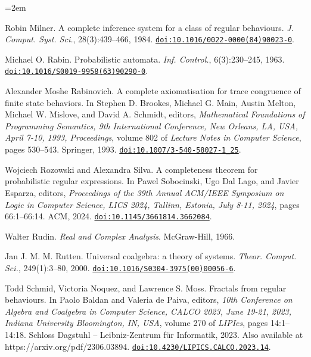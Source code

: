 \documentclass[11pt,a4paper]{amsart}
\begin{document}
\begin{list}{}{\leftmargin=2em}
\hypertarget{html:bib.bib15}{}
\item[]  [15]  Robin Milner.  A complete inference system for a class of regular behaviours.  \emph{J. Comput. Syst. Sci.}, 28(3):439–466, 1984.  \href{https://doi.org/10.1016/0022-0000(84)90023-0}{\nolinkurl{doi:10.1016/0022-0000(84)90023-0}}.  
\hypertarget{html:bib.bib16}{}
\item[]  [16]  Michael O. Rabin.  Probabilistic automata.  \emph{Inf. Control.}, 6(3):230–245, 1963.  \href{https://doi.org/10.1016/S0019-9958(63)90290-0}{\nolinkurl{doi:10.1016/S0019-9958(63)90290-0}}.  
\hypertarget{html:bib.bib17}{}
\item[]  [17]  Alexander Moshe Rabinovich.  A complete axiomatisation for trace congruence of finite state behaviors.  In Stephen D. Brookes, Michael G. Main, Austin Melton, Michael W. Mislove, and David A. Schmidt, editors, \emph{Mathematical Foundations of Programming Semantics, 9th International Conference, New Orleans, LA, USA, April 7-10, 1993, Proceedings}, volume 802 of \emph{Lecture Notes in Computer Science}, pages 530–543. Springer, 1993.  \href{https://doi.org/10.1007/3-540-58027-1_25}{\nolinkurl{doi:10.1007/3-540-58027-1_25}}.  
\hypertarget{html:bib.bib18}{}
\item[]  [18]  Wojciech Rozowski and Alexandra Silva.  A completeness theorem for probabilistic regular expressions.  In Pawel Sobocinski, Ugo Dal Lago, and Javier Esparza, editors, \emph{Proceedings of the 39th Annual ACM/IEEE Symposium on Logic in Computer Science, LICS 2024, Tallinn, Estonia, July 8-11, 2024}, pages 66:1–66:14. ACM, 2024.  \href{https://doi.org/10.1145/3661814.3662084}{\nolinkurl{doi:10.1145/3661814.3662084}}.  
\hypertarget{html:bib.bib19}{}
\item[]  [19]  Walter Rudin.  \emph{Real and Complex Analysis}.  McGraw-Hill, 1966.  
\hypertarget{html:bib.bib20}{}
\item[]  [20]  Jan J. M. M. Rutten.  Universal coalgebra: a theory of systems.  \emph{Theor. Comput. Sci.}, 249(1):3–80, 2000.  \href{https://doi.org/10.1016/S0304-3975(00)00056-6}{\nolinkurl{doi:10.1016/S0304-3975(00)00056-6}}.  
\hypertarget{html:bib.bib21}{}
\item[]  [21]  Todd Schmid, Victoria Noquez, and Lawrence S. Moss.  Fractals from regular behaviours.  In Paolo Baldan and Valeria de Paiva, editors, \emph{10th Conference on Algebra and Coalgebra in Computer Science, CALCO 2023, June 19-21, 2023, Indiana University Bloomington, IN, USA}, volume 270 of \emph{LIPIcs}, pages 14:1–14:18. Schloss Dagstuhl – Leibniz-Zentrum für Informatik, 2023.  Also available at https://arxiv.org/pdf/2306.03894.  \href{https://doi.org/10.4230/LIPICS.CALCO.2023.14}{\nolinkurl{doi:10.4230/LIPICS.CALCO.2023.14}}.  

\end{list}
\end{document}
